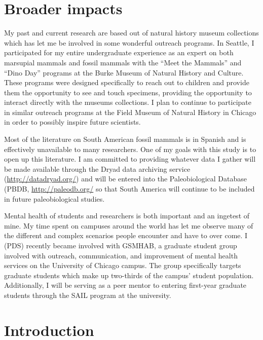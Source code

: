 \documentclass[11pt,letterpaper]{article}
\begin{document}
\section{Broader impacts}

My past and current research are based out of natural history museum collections which has let me be involved in some wonderful outreach programs. In Seattle, I participated for my entire undergraduate experience as an expert on both marsupial mammals and fossil mammals with the ``Meet the Mammals'' and ``Dino Day'' programs at the Burke Museum of Natural History and Culture. These programs were designed specifically to reach out to children and provide them the opportunity to see and touch specimens, providing the opportunity to interact directly with the museums collections. I plan to continue to participate in similar outreach programs at the Field Museum of Natural History in Chicago in order to possibly inspire future scientists. %

Most of the literature on South American fossil mammals is in Spanish and is effectively unavailable to many researchers. One of my goals with this study is to open up this literature. I am committed to providing whatever data I gather will be made available through the Dryad data archiving service (\url{http://datadryad.org/}) and will be entered into the Paleobiological Database (PBDB, \url{http://paleodb.org/} so that South America will continue to be included in future paleobiological studies.

Mental health of students and researchers is both important and an ingetest of mine. My time spent on campuses around the world has let me observe many of the different and complex scenarios people encounter and have to over come. I (PDS) recently became involved with GSMHAB, a graduate student group involved with outreach, communication, and improvement of mental health services on the University of Chicago campus. The group specifically targets graduate students which make up two-thirds of the campus' student population. Additionally, I will be serving as a peer mentor to entering first-year graduate students through the SAIL program at the university.

\section{Introduction}
\end{document}
